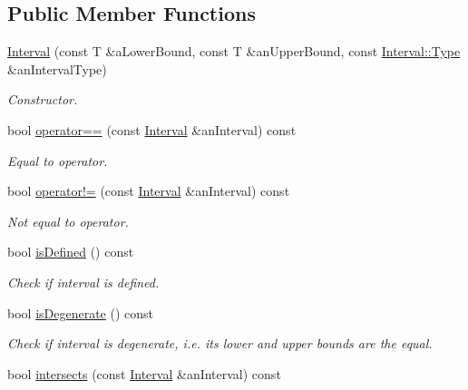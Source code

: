 \subsection*{Public Member Functions}
\begin{DoxyCompactItemize}
\item 
\hyperlink{classlibrary_1_1math_1_1obj_1_1_interval_ad3c3506ca4e90506ab1ea25a18fc5cd7}{Interval} (const T \&a\+Lower\+Bound, const T \&an\+Upper\+Bound, const \hyperlink{classlibrary_1_1math_1_1obj_1_1_interval_base_aabce6fa07a6e2e8fd3fcab5fd0d317d6}{Interval\+::\+Type} \&an\+Interval\+Type)
\begin{DoxyCompactList}\small\item\em Constructor. \end{DoxyCompactList}\item 
bool \hyperlink{classlibrary_1_1math_1_1obj_1_1_interval_a99b12768e33b75bf87ab656b92c03e98}{operator==} (const \hyperlink{classlibrary_1_1math_1_1obj_1_1_interval}{Interval} \&an\+Interval) const
\begin{DoxyCompactList}\small\item\em Equal to operator. \end{DoxyCompactList}\item 
bool \hyperlink{classlibrary_1_1math_1_1obj_1_1_interval_a5ca4c08ba0aff1ea42ea3804d51e02cf}{operator!=} (const \hyperlink{classlibrary_1_1math_1_1obj_1_1_interval}{Interval} \&an\+Interval) const
\begin{DoxyCompactList}\small\item\em Not equal to operator. \end{DoxyCompactList}\item 
bool \hyperlink{classlibrary_1_1math_1_1obj_1_1_interval_a2de37bb9d7b97ae7892188c26c99b6fb}{is\+Defined} () const
\begin{DoxyCompactList}\small\item\em Check if interval is defined. \end{DoxyCompactList}\item 
bool \hyperlink{classlibrary_1_1math_1_1obj_1_1_interval_a0e9997639f0c415f4f7fe8dcb58e13a8}{is\+Degenerate} () const
\begin{DoxyCompactList}\small\item\em Check if interval is degenerate, i.\+e. its lower and upper bounds are the equal. \end{DoxyCompactList}\item 
bool \hyperlink{classlibrary_1_1math_1_1obj_1_1_interval_aba618feb6e4b6d052999c2b8c8c0b06a}{intersects} (const \hyperlink{classlibrary_1_1math_1_1obj_1_1_interval}{Interval} \&an\+Interval) const

\end{DoxyCompactItemize}

